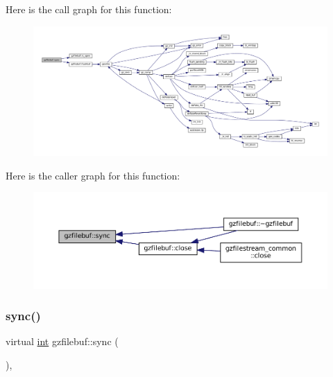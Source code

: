 Here is the call graph for this function\+:
\nopagebreak
\begin{figure}[H]
\begin{center}
\leavevmode
\includegraphics[width=350pt]{classgzfilebuf_ae537a3f86b37de7bf27d2aff0cded07e_cgraph}
\end{center}
\end{figure}
Here is the caller graph for this function\+:
\nopagebreak
\begin{figure}[H]
\begin{center}
\leavevmode
\includegraphics[width=350pt]{classgzfilebuf_ae537a3f86b37de7bf27d2aff0cded07e_icgraph}
\end{center}
\end{figure}
\mbox{\label{classgzfilebuf_a8fdf6b079487c0034cb920c63c9eaf55}} 
\subsubsection{\texorpdfstring{sync()}{sync()}\hspace{0.1cm}{\footnotesize\ttfamily [2/2]}}
{\footnotesize\ttfamily virtual \mbox{\hyperlink{ioapi_8h_a787fa3cf048117ba7123753c1e74fcd6}{int}} gzfilebuf\+::sync (\begin{DoxyParamCaption}{ }\end{DoxyParamCaption})\hspace{0.3cm}{\ttfamily [protected]}, {\ttfamily [virtual]}}



